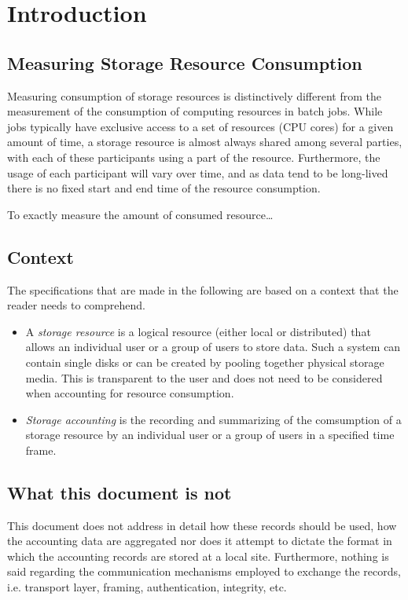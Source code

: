 \section{Introduction}

\subsection{Measuring Storage Resource Consumption}

Measuring consumption of storage resources is distinctively different from
the measurement of the consumption of computing resources in batch jobs. 
While jobs typically have exclusive access
to a set of resources (CPU cores) for a given amount of time, a storage
resource is almost always shared
among several parties, with each of these participants using a part of the
resource. Furthermore, the usage of each participant will vary over time, and as
data tend to be long-lived there is no fixed start and end time of the resource
consumption.

To exactly measure the amount of consumed resource\ldots

\subsection{Context}
The specifications that are made in the following are based
on a context that the reader needs to comprehend.
\begin{itemize}
 \item A \textit{storage resource} is a logical resource (either local or distributed) 
that allows an individual user or a group of users to store data. Such a system 
can contain single disks or can be created by pooling together physical storage 
media. This is transparent to the user and does not need to be considered when accounting for resource consumption.
 \item \textit{Storage accounting} is the recording and summarizing of the comsumption 
of a storage resource by an individual user or a group of users in a specified 
time frame.
\end{itemize}

\subsection{What this document is not}
This document does not address in detail how these records should be used, 
how the accounting data are aggregated 
nor does it attempt to dictate the format in which the accounting records are 
stored at a local site. 
Furthermore, nothing is said regarding the communication mechanisms
employed to exchange the records, i.e. transport layer, framing, 
authentication, integrity, etc.


